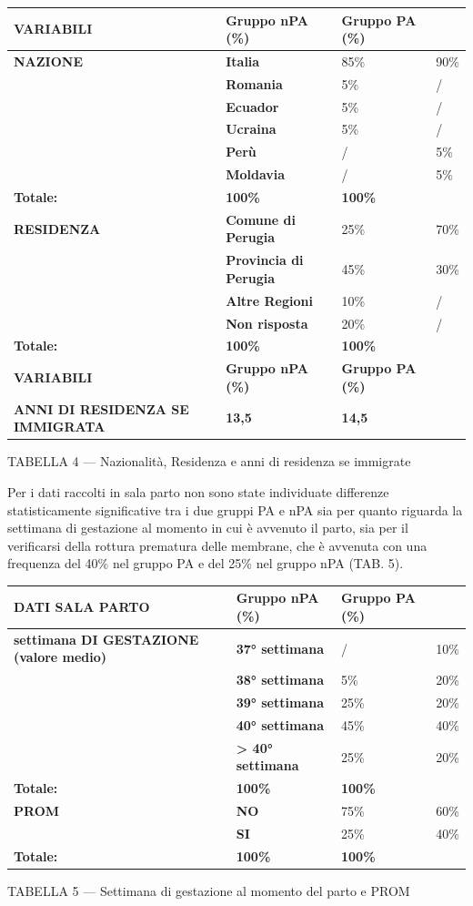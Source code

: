 \documentclass[]{article}
\begin{document}
\begin{longtable}[]{@{}llll@{}}
\toprule
\textbf{VARIABILI} & \textbf{Gruppo nPA (\%)} & \textbf{Gruppo PA (\%)}
&\tabularnewline
\midrule
\endhead
\textbf{NAZIONE} & \textbf{Italia} & 85\% & 90\%\tabularnewline
& \textbf{Romania} & 5\% & /\tabularnewline
& \textbf{Ecuador} & 5\% & /\tabularnewline
& \textbf{Ucraina} & 5\% & /\tabularnewline
& \textbf{Perù} & / & 5\%\tabularnewline
& \textbf{Moldavia} & / & 5\%\tabularnewline
\textbf{Totale:} & \textbf{100\%} & \textbf{100\%} &\tabularnewline
\textbf{RESIDENZA} & \textbf{Comune di Perugia} & 25\% &
70\%\tabularnewline
& \textbf{Provincia di Perugia} & 45\% & 30\%\tabularnewline
& \textbf{Altre Regioni} & 10\% & /\tabularnewline
& \textbf{Non risposta} & 20\% & /\tabularnewline
\textbf{Totale:} & \textbf{100\%} & \textbf{100\%} &\tabularnewline
\textbf{VARIABILI} & \textbf{Gruppo nPA (\%)} & \textbf{Gruppo PA (\%)}
&\tabularnewline
\textbf{ANNI DI RESIDENZA SE IMMIGRATA} & \textbf{13,5} & \textbf{14,5}
&\tabularnewline
\bottomrule
\end{longtable}

TABELLA 4 --- Nazionalità, Residenza e anni di residenza se immigrate

Per i dati raccolti in sala parto non sono state individuate differenze
statisticamente significative tra i due gruppi PA e nPA sia per quanto
riguarda la settimana di gestazione al momento in cui è avvenuto il
parto, sia per il verificarsi della rottura prematura delle membrane,
che è avvenuta con una frequenza del 40\% nel gruppo PA e del 25\% nel
gruppo nPA (TAB. 5).

\begin{longtable}[]{@{}llll@{}}
\toprule
\textbf{DATI SALA PARTO} & \textbf{Gruppo nPA (\%)} & \textbf{Gruppo PA
(\%)} &\tabularnewline
\midrule
\endhead
\textbf{settimana DI GESTAZIONE (valore medio)} & \textbf{37° settimana}
& / & 10\%\tabularnewline
& \textbf{38° settimana} & 5\% & 20\%\tabularnewline
& \textbf{39° settimana} & 25\% & 20\%\tabularnewline
& \textbf{40° settimana} & 45\% & 40\%\tabularnewline
& \textbf{\textgreater{} 40° settimana} & 25\% & 20\%\tabularnewline
\textbf{Totale:} & \textbf{100\%} & \textbf{100\%} &\tabularnewline
\textbf{PROM} & \textbf{NO} & 75\% & 60\%\tabularnewline
& \textbf{SI} & 25\% & 40\%\tabularnewline
\textbf{Totale:} & \textbf{100\%} & \textbf{100\%} &\tabularnewline
\bottomrule
\end{longtable}

TABELLA 5 --- Settimana di gestazione al momento del parto e PROM
\end{document}
